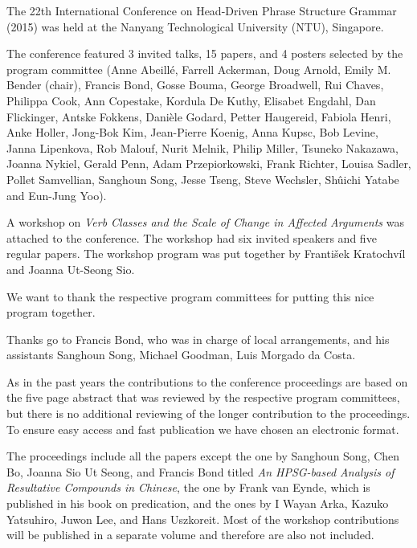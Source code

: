 The 22th International Conference on Head-Driven Phrase Structure Grammar (2015) was held at the Nanyang Technological University (NTU), Singapore.

The conference featured 3 invited talks, 15 papers, and 4 posters selected by the program committee 
(Anne Abeillé,
    Farrell Ackerman,
    Doug Arnold,
    Emily M. Bender (chair),
    Francis Bond,
    Gosse Bouma,
    George Broadwell,
    Rui Chaves,
    Philippa Cook,
    Ann Copestake,
    Kordula De Kuthy,
    Elisabet Engdahl,
    Dan Flickinger,
    Antske Fokkens,
    Danièle Godard,
    Petter Haugereid,
    Fabiola Henri,
    Anke Holler,
    Jong-Bok Kim,
    Jean-Pierre Koenig,
    Anna Kupsc,
    Bob Levine,
    Janna Lipenkova,
    Rob Malouf,
    Nurit Melnik,
    Philip Miller,
    Tsuneko Nakazawa,
    Joanna Nykiel,
    Gerald Penn,
    Adam Przepiorkowski,
    Frank Richter,
    Louisa Sadler,
    Pollet Samvellian,
    Sanghoun Song,
    Jesse Tseng,
    Steve Wechsler,
    Shûichi Yatabe and
    Eun-Jung Yoo).

A workshop on \emph{Verb Classes and the Scale of Change in Affected Arguments}
was attached to the conference. The workshop had six invited speakers and 
five regular papers. The workshop program was put together by František Kratochvíl and Joanna Ut-Seong Sio.

We want to thank the respective program committees for putting this nice program together.

Thanks go to Francis Bond, who was
in charge of local arrangements, and his assistants Sanghoun Song, Michael Goodman,  Luis Morgado da Costa.
 

As in the past years the contributions to the conference proceedings are based on the five page abstract
that was reviewed by the respective program committees, but there is no additional reviewing of the
longer contribution to the proceedings.
To ensure easy access and fast publication we have chosen an electronic format.

The proceedings include all the papers except the one by Sanghoun Song, Chen Bo, Joanna Sio Ut
Seong, and Francis Bond titled \emph{An HPSG-based Analysis of Resultative Compounds in Chinese},
the one by Frank van Eynde, which is published in his book on predication, and the ones by I Wayan
Arka, Kazuko Yatsuhiro, Juwon Lee, and Hans
Uszkoreit. Most of the workshop contributions will be published in a separate volume and therefore
are also not included.



